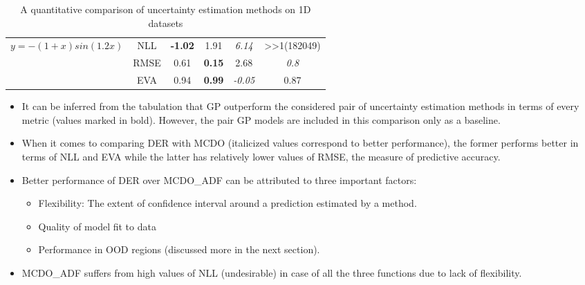 \begin{table}[H]
\begin{tabular}{|c|c|c|c|c|c|}
		\multirow{3}{*}{$y=-(1+x)sin(1.2x)$}                               & NLL             & \textbf{-1.02}                                                      & 1.91                                                                  & \textit{6.14}                & \textgreater{}\textgreater{}1(182049) \\ \cline{2-6} 
		& RMSE            & 0.61                                                                & \textbf{0.15}                                                         & 2.68                & \textit{0.8}                                   \\ \cline{2-6} 
		& EVA             & 0.94                                                                & \textbf{0.99}                                                         & \textit{-0.05}               & 0.87                                  \\ \hline
	\end{tabular}
	\caption{A quantitative comparison of uncertainty estimation methods on 1D datasets}
	\label{tab_quant_compare1D}
\end{table}

\begin{itemize}
	\item It can be inferred from the tabulation that GP outperform the considered pair of uncertainty estimation methods in terms of every metric (values marked in bold). However, the pair GP models are included in this comparison only as a baseline.
	\item When it comes to comparing DER with MCDO (italicized values correspond to better performance), the former performs better in terms of NLL and EVA while the latter has relatively lower values of RMSE, the measure of predictive accuracy.
	\item Better performance of DER over MCDO\_ADF can be attributed to three important factors:
	\begin{itemize}
		\item Flexibility: The extent of confidence interval around a prediction estimated by a method.
		\item Quality of model fit to data
		\item Performance in OOD regions (discussed more in the next section).
	\end{itemize}
	\item MCDO\_ADF suffers from high values of NLL (undesirable) in case of all the three functions due to lack of flexibility.
\end{itemize}

